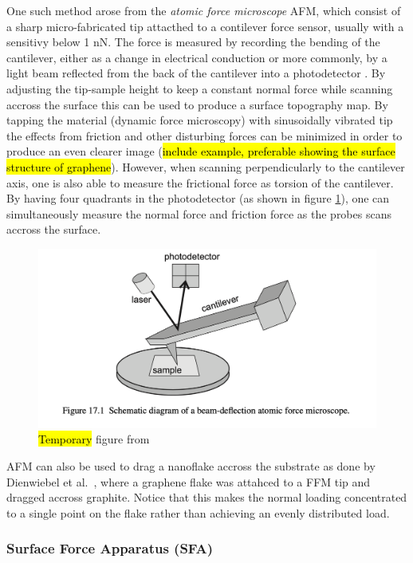 One such method arose from the \textit{atomic force microscope} \acrshort{AFM}, which consist
of a sharp micro-fabricated tip attacthed to a contilever force sensor, usually
with a sensitivy below 1 nN. The force is measured by recording the bending of
the cantilever, either as a change in electrical conduction or more commonly, by
a light beam reflected from the back of the cantilever into a photodetector
\cite[p. 183]{gnecco_meyer_2015}. By adjusting the tip-sample height to keep a constant
normal force while scanning accross the surface this can be used to produce a
surface topography map. By tapping the material (dynamic force microscopy) with
sinusoidally vibrated tip the effects from friction and other disturbing forces
can be minimized in order to produce an even clearer image (\hl{include example,
preferable showing the surface structure of graphene}). However, when scanning
perpendicularly to the cantilever axis, one is also able to measure the
frictional force as torsion of the cantilever. By having four quadrants in the
photodetector (as shown in figure \cref{fig:AFM}), one can simultaneously
measure the normal force and friction force as the probes scans accross the
surface. 

\begin{figure}[H]
  \centering
  \includegraphics[width=0.6\linewidth]{figures/theory/AFM.png}
  \caption{\hl{Temporary} figure from \cite[p. 184]{gnecco_meyer_2015}}
  \label{fig:AFM}
\end{figure}


\acrshort{AFM} can also be used to drag a nanoflake accross the substrate as done by
Dienwiebel et al.\ \cite{DIENWIEBEL2005197}, where a graphene flake was attahced
to a \acrshort{FFM} tip and dragged accross graphite. Notice that this makes the normal
loading concentrated to a single point on the flake rather than achieving an evenly distributed load. 



\subsubsection{Surface Force Apparatus (SFA)}

